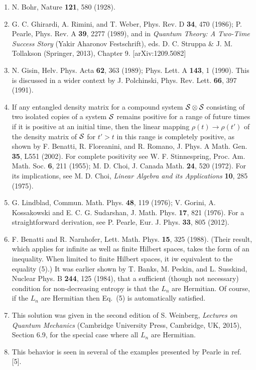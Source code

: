 \begin{enumerate}


\item N. Bohr, Nature {\bf 121}, 580 (1928).
\item G. C. Ghirardi, A. Rimini,
and T. Weber, Phys. Rev. D {\bf 34}, 470 (1986);  P. Pearle, Phys. Rev. A {\bf 39}, 2277 (1989), and in {\em Quantum Theory: A Two-Time Success Story} (Yakir Aharonov Festschrift), eds. D. C. Struppa \& J. M. Tollakson (Springer, 2013), Chapter 9. [arXiv:1209.5082]
\item N. Gisin, Helv. Phys. Acta {\bf 62}, 363 (1989); Phys. Lett. A {\bf 143}, 1 (1990).  This is discussed in a wider context by J. Polchinski, Phys. Rev. Lett. {\bf 66}, 397 (1991).
\item  If any entangled density matrix for a compound system ${\cal S}\otimes {\cal S}$ consisting of two isolated copies of a system ${\cal S}$ remains positive for a  range of future times if it is positive at an initial time, then the linear mapping $\rho(t)\rightarrow\rho(t')$ of the density matrix of ${\cal S}$  for $t'>t$ in this range is completely positive,  as shown by F. Benatti, R. Floreanini, and R. Romano,  J. Phys. A Math. Gen.  {\bf 35}, L551 (2002).  For complete positivity see W. F. Stinnespring, Proc. Am. Math. Soc. {\bf 6}, 211 (1955); M. D. Choi, J. Canada Math. {\bf 24}, 520 (1972).  For its  implications, see  M. D. Choi, {\it Linear Algebra and its Applications} {\bf 10}, 285 (1975).  
\item G. Lindblad, Commun. Math. Phys. {\bf 48}, 119 (1976); V. Gorini, A. Kossakowski and E. C. G. Sudarshan, J. Math. Phys. {\bf 17}, 821 (1976).  For a straightforward derivation, see P. Pearle, Eur. J. Phys. {\bf 33}, 805 (2012).
\item F. Benatti and R. Narnhofer, Lett. Math. Phys. {\bf 15}, 325 (1988).  (Their result, which applies for infinite as well as finite Hilbert spaces, takes the form of an inequality.  When limited to finite Hilbert spaces, it iw equivalent to  the equality (5).)  It was earlier shown by T. Banks, M. Peskin, and L. Susskind, Nuclear Phys. B {\bf 244}, 125 (1984), that a sufficient (though not necessary) condition for non-decreasing entropy is that the $L_n$ are Hermitian.  Of course, if the $L_n$ are Hermitian then Eq.~(5) is automatically satisfied.
\item This solution was  given in the second edition of S. Weinberg, {\em Lectures on Quantum Mechanics} (Cambridge University Press, Cambridge, UK, 2015), Section 6.9, for the special case where all $L_n$ are Hermitian.
\item This behavior is seen in several of the examples presented by Pearle in ref. [5].
\end{enumerate}

